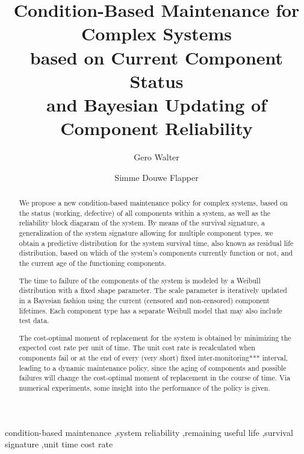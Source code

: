 \documentclass[authoryear]{elsarticle}
\begin{document}

\begin{frontmatter}
\title{Condition-Based Maintenance for Complex Systems\\ based on Current Component Status\\ and Bayesian Updating of Component Reliability}

\author[tue]{Gero Walter}
\author[tue]{Simme Douwe Flapper}

\address[tue]{School of Industrial Engineering, Eindhoven University of Technology, Eindhoven, The Netherlands}


\begin{abstract}
We propose a new condition-based maintenance policy for complex systems,
based on the status (working, defective) of all components within a system,
as well as the reliability block diagaram of the system.
%
By means of the survival signature,
a generalization of the system signature allowing for multiple component types,
we obtain a predictive distribution for the system survival time,
also known as residual life distribution,
based on which of the system's components currently function or not,
and the current age of the functioning components.

The time to failure of the components of the system
is modeled by a Weibull distribution with a fixed shape parameter.
The scale parameter is iteratively updated in a Bayesian fashion
using the current (censored and non-censored) component lifetimes.
Each component type has a separate Weibull model that may also include test data.

The cost-optimal moment of replacement for the system is obtained by minimizing
the expected cost rate per unit of time.
The unit cost rate is recalculated when components fail
or at the end of every (very short) fixed inter-monitoring*** interval,
leading to a dynamic maintenance policy,
since the aging of components and possible failures will change the cost-optimal moment of replacement in the course of time.
Via numerical experiments, some insight into the performance of the policy is given.
\end{abstract}

\begin{keyword}
condition-based maintenance \sep system reliability \sep remaining useful life \sep survival signature \sep unit time cost rate\end{keyword}
\end{frontmatter}
\end{document}

